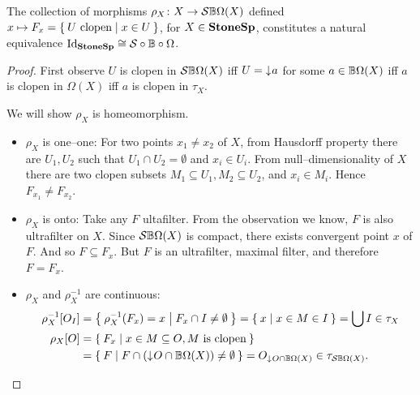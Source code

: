 \begin{proposition}
    The collection of morphisms $\rho_X\colon X \to \mathcal{S}\mathbb{B}\Omega(X)$ defined $x \mapsto F_x = \Set{U\text{ clopen} | x\in U }$, for $X \in \mathbf{StoneSp}$, constitutes a natural equivalence $\operatorname{Id}_{\mathbf{StoneSp}} \cong \mathcal{S}\circ\mathbb{B}\circ\Omega$.
\end{proposition}
\begin{proof}
    First observe $U$ is clopen in $\mathcal{S}\mathbb{B}\Omega(X)$ iff $U = \mathord{\downarrow}\mkern1mu a$ for some $a \in \mathbb{B}\Omega(X)$ iff $a$ is clopen in $\Omega(X)$ iff $a$ is clopen in $\tau_X$.

    We will show $\rho_X$ is homeomorphism.
    \begin{itemize}
        \item $\rho_X$ is one--one: For two points $x_1 \neq x_2$ of $X$, from Hausdorff property there are $U_1, U_2$ such that $U_1\cap U_2 = \emptyset$ and $x_i\in U_i$. From null--dimensionality of $X$ there are two clopen subsets $M_1 \subseteq U_1, M_2 \subseteq U_2$, and $x_i \in M_i$. Hence $F_{x_1} \neq F_{x_2}$.

        \item $\rho_X$ is onto: Take any $F$ ultafilter. From the observation we know, $F$ is also ultrafilter on $X$. Since $\mathcal{S}\mathbb{B}\Omega(X)$ is compact, there exists convergent point $x$ of $F$. And so $F \subseteq F_x$. But $F$ is an ultrafilter, maximal filter, and therefore $F = F_x$.

        \item $\rho_X$ and $\rho_X^{-1}$ are continuous:
        \begin{align*}
            \rho_X^{-1}[O_I] &= \Set{ \rho_X^{-1}(F_x) = x | F_x \cap I \neq \emptyset} 
                = \Set{ x | x \in M \in I } = \bigcup I \in \tau_X \\
            \rho_X[O] &= \Set{ F_x | x \in M \subseteq O, M \text{ is clopen}} \\
                      &= \Set{ F | F \cap (\mathord{\downarrow}\mkern1muO \cap \ensuremath{\mathbb{B}}\Omega(X)) \neq \emptyset} = O_{\mathord{\downarrow}\mkern1mu O \cap \mathbb{B}\Omega(X)} \in \tau_{\mathcal{S}\mathbb{B}\Omega(X)}.
        \end{align*}
    \end{itemize}


\end{proof}
